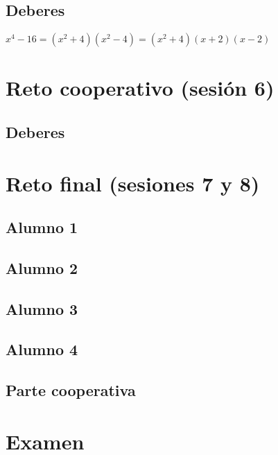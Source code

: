 \subsection{Deberes}
\label{ses4:deberes}

$x^4-16 = (x^2+4)(x^2-4) = (x^2+4)(x+2)(x-2)$

\section{Reto cooperativo (sesión 6)}
\label{ses6:coop}

\subsection{Deberes}
\label{ses6:deberes}



\section{Reto final (sesiones 7 y 8)}

\subsection{Alumno 1}


\subsection{Alumno 2}


\subsection{Alumno 3}


\subsection{Alumno 4}



\subsection{Parte cooperativa}


\section{Examen}
\label{examen}